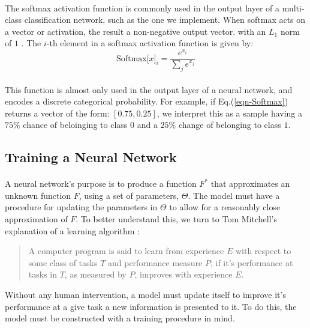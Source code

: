 \documentclass[12pt,letterpaper]{article}
\begin{document}
\paragraph*{}The softmax activation function is commonly used in the output layer of a multi-class classification network, such as the one we implement. When softmax acts on a vector or activation, the result a non-negative output vector. with an $L_1$ norm of $1$ \cite{Geron,Goodfellow,Virtanen}. The $i$-th element in a softmax activation function is given by:
\begin{equation}
\label{eqn-Softmax}
\text{Softmax}\big[ x \big]_{i} = \frac{e^{x_i}}{\sum_{j}e^{x_j}}
\end{equation}

\paragraph*{}This function is almost only used in the output layer of a neural network, and encodes a discrete categorical probability. For example, if Eq.(\ref{eqn-Softmax}) returns a vector of the form: $[ 0.75 , 0.25]$, we interpret this as a sample having a $75\%$ chance of beloinging to class $0$ and a $25\%$ change of belonging to class $1$.



\subsection{Training a Neural Network}
\label{subsec-Training}

\paragraph*{}A neural network's purpose is to produce a function $F^*$ that approximates an unknown function $F$, using a set of parameters, $\Theta$. The model must have a procedure for updating the parameters in $\Theta$ to allow for a reasonably close approximation of $F$. To better understand this, we turn to Tom Mitchell's explanation of a learning algorithm \cite{Goodfellow,Mitchell}:
\begin{quote}
A computer program is said to learn from experience $E$ with respect to some class of tasks $T$ and performance measure $P$, if it's performance at tasks in $T$, as measured by $P$, improves with experience $E$.
\end{quote}
Without any human intervention, a model must update itself to improve it's performance at a give task a new information is presented to it. To do this, the model must be constructed with a training procedure in mind. 
\end{document}
